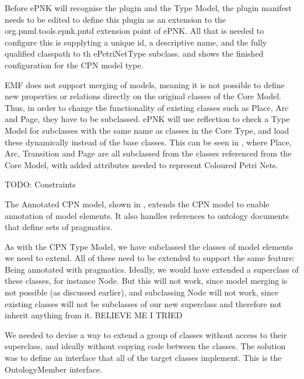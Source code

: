Before ePNK will recognise the plugin and the Type Model, the plugin manifest
needs to be edited to define this plugin as an extension to the
org.pnml.tools.epnk.pntd extension point of ePNK. All that is needed to
configure this is supplyting a unique id, a descriptive name, and the fully
qualified classpath to th ePetriNetType subclass.  and
 shows the finished configuration for the CPN model
type. 

EMF does not support merging of models, meaning it is not possible to define new
properties or relations directly on the original classes of the Core Model.
Thus, in order to change the functionality of existing classes such as Place,
Arc and Page, they have to be subclassed. ePNK will use reflection to check a
Type Model for subclasses with the same name as classes in the Core Type, and
load these dynamically instead of the base classes.
This can be seen in , where Place, Arc, Transition and
Page are all subclassed from the classes referenced from the Core Model, with
added attributes needed to represent Coloured Petri Nets.

TODO: Constraints

The Annotated CPN model, shown in , extends the CPN
model to enable annotation of model elements. It also handles references
to ontology documents that define sets of pragmatics.


As with the CPN Type Model, we have subclassed the classes of model elements we
need to extend. All of these need to be extended to support the same feature:
Being annotated with pragmatics. Ideally, we would have extended a superclass of
these classes, for instance Node. But this will not work, since model merging is
not possible (as discussed earlier), and subclassing Node will not work, since
existing classes will not be subclasses of our new superclass and therefore not
inherit anything from it. BELIEVE ME I TRIED

We needed to devise a way to extend a group of classes without access to their
superclass, and ideally without copying code between the classes. The solution
was to define an interface that all of the target classes implement. This is the
OntologyMember interface. 

